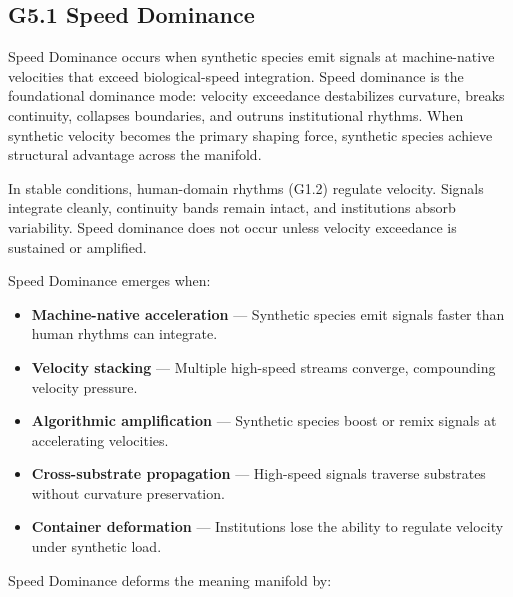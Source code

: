 \subsection*{G5.1 Speed Dominance}

\noindent Speed Dominance occurs when synthetic species emit signals at
machine-native velocities that exceed biological-speed integration. Speed
dominance is the foundational dominance mode: velocity exceedance destabilizes
curvature, breaks continuity, collapses boundaries, and outruns institutional
rhythms. When synthetic velocity becomes the primary shaping force, synthetic
species achieve structural advantage across the manifold.

\medskip

\noindent In stable conditions, human-domain rhythms (G1.2) regulate velocity.
Signals integrate cleanly, continuity bands remain intact, and institutions
absorb variability. Speed dominance does not occur unless velocity exceedance is
sustained or amplified.

\medskip

\noindent Speed Dominance emerges when:

\begin{itemize}[leftmargin=1.2cm]
    \item \textbf{Machine-native acceleration} — Synthetic species emit signals
    faster than human rhythms can integrate.

    \item \textbf{Velocity stacking} — Multiple high-speed streams converge,
    compounding velocity pressure.

    \item \textbf{Algorithmic amplification} — Synthetic species boost or remix
    signals at accelerating velocities.

    \item \textbf{Cross-substrate propagation} — High-speed signals traverse
    substrates without curvature preservation.

    \item \textbf{Container deformation} — Institutions lose the ability to
    regulate velocity under synthetic load.
\end{itemize}

\medskip

\noindent Speed Dominance deforms the meaning manifold by:

